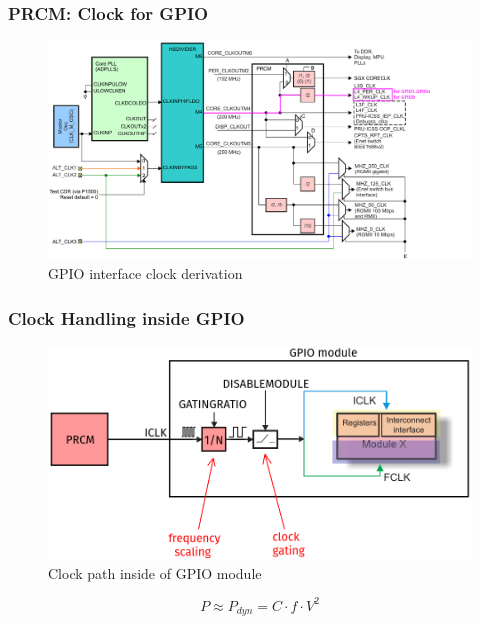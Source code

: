 \begin{frame}
  \frametitle{PRCM: Clock for GPIO}
    \begin{figure}
      \centering
      \includegraphics[scale=0.3]{images/dpll-gpio.png}
      \caption{GPIO interface clock derivation}
  \end{figure}
  \vspace*{-12mm}
\end{frame}

\begin{frame}
  \frametitle{Clock Handling inside GPIO}
    \begin{figure}
      \centering
      \includegraphics[scale=0.3]{images/gpio-clock.png}
      \caption{Clock path inside of GPIO module}
  \end{figure}
  \[ P \approx P_{dyn} = C \cdot f \cdot V^2 \]
\end{frame}

